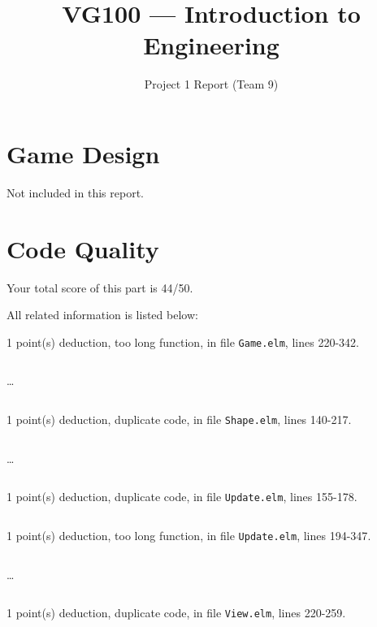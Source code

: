 \documentclass{article}
\title{VG100 --- Introduction to\\ Engineering}
\subtitle{Project 1 Report (Team 9)}
\begin{document}
\maketitle

\section{Game Design}

Not included in this report.

\section{Code Quality}

Your total score of this part is 44/50. \medskip

All related information is listed below: \medskip

1 point(s) {\color{red}deduction}, too long function, in file {\color{blue}\texttt{Game.elm}}, lines {\color{blue}220-342}.

\inputminted[firstline=220,lastline=229]{elm}{Game.elm}

\dots

\inputminted[firstline=333,lastline=342]{elm}{Game.elm}

1 point(s) {\color{red}deduction}, duplicate code, in file {\color{blue}\texttt{Shape.elm}}, lines {\color{blue}140-217}.

\inputminted[firstline=140,lastline=149]{elm}{Shape.elm}

\dots

\inputminted[firstline=208,lastline=217]{elm}{Shape.elm}

1 point(s) {\color{red}deduction}, duplicate code, in file {\color{blue}\texttt{Update.elm}}, lines {\color{blue}155-178}.

\inputminted[firstline=155,lastline=178]{elm}{Update.elm}

1 point(s) {\color{red}deduction}, too long function, in file {\color{blue}\texttt{Update.elm}}, lines {\color{blue}194-347}.

\inputminted[firstline=194,lastline=203]{elm}{Update.elm}

\dots

\inputminted[firstline=338,lastline=347]{elm}{Update.elm}

1 point(s) {\color{red}deduction}, duplicate code, in file {\color{blue}\texttt{View.elm}}, lines {\color{blue}220-259}.

\inputminted[firstline=220,lastline=229]{elm}{View.elm}
\end{document}
